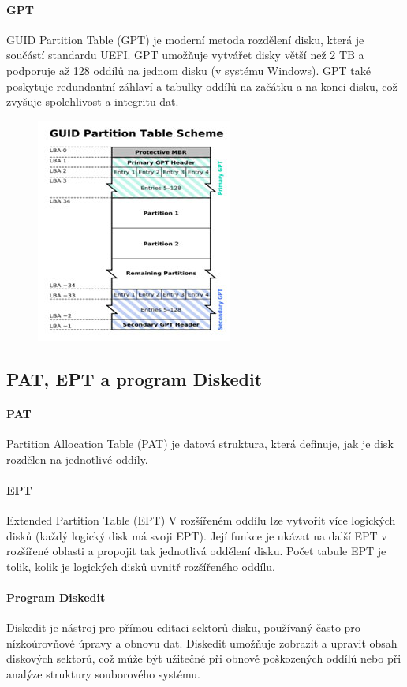 \paragraph{GPT}
GUID Partition Table (GPT) je moderní metoda rozdělení disku, která je součástí standardu UEFI. GPT umožňuje vytvářet disky větší než 2 TB a podporuje až 128 oddílů na jednom disku (v systému Windows). GPT také poskytuje redundantní záhlaví a tabulky oddílů na začátku a na konci disku, což zvyšuje spolehlivost a integritu dat.

\begin{figure}[h]
\centering
\includegraphics[scale=0.5]{sections/14_org_struk_pev_disk_op_sys_win/images/gpt-scheme-26093702.jpg}
\end{figure}

\subsection{PAT, EPT a program Diskedit}
\paragraph{PAT}
Partition Allocation Table (PAT) je datová struktura, která definuje, jak je disk rozdělen na jednotlivé oddíly.

\paragraph{EPT}
Extended Partition Table (EPT) V rozšířeném oddílu lze vytvořit více logických disků (každý logický disk má svoji EPT). Její funkce je ukázat na další EPT v rozšířené oblasti a propojit tak jednotlivá oddělení disku. Počet tabule EPT je tolik, kolik je logických disků uvnitř rozšířeného oddílu.

\paragraph{Program Diskedit}
Diskedit je nástroj pro přímou editaci sektorů disku, používaný často pro nízkoúrovňové úpravy a obnovu dat. Diskedit umožňuje zobrazit a upravit obsah diskových sektorů, což může být užitečné při obnově poškozených oddílů nebo při analýze struktury souborového systému.

